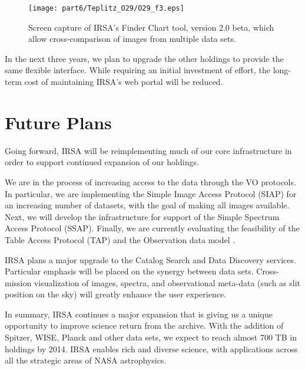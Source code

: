 \begin{figure}[t]

\centering
\texttt{[image: part6/Teplitz\_O29/O29\_f3.eps]}
\caption{Screen capture of IRSA's Finder Chart tool, version 2.0 beta, which allow cross-comparison of images from multiple data sets.}

\end{figure}


In the next three years, we plan to upgrade the other holdings to provide the same flexible interface. While requiring an initial investment of effort, the long-term cost of maintaining IRSA’s web portal will be reduced.

\section{Future Plans}

Going forward, IRSA will be reimplementing much of our core infrastructure in order to support continued expansion of our holdings.  

We are in the process of increasing access to the data through the VO protocols.  In particular, we are implementing the Simple Image Access Protocol (SIAP) for an increasing number of datasets, with the goal of making all images available.  Next, we will develop the infrastructure for support of the Simple Spectrum Access Protocol (SSAP). Finally, we are currently evaluating the feasibility of the Table Access Protocol (TAP) and the Observation data model \citet{louys11}.

IRSA plans a major upgrade to the Catalog Search and Data Discovery services.  Particular emphasis will be placed on the synergy between data sets. Cross-mission visualization of images, spectra, and observational meta-data (such as slit position on the sky) will greatly enhance the user experience.

In summary, IRSA continues a major expansion that is giving us a unique opportunity to improve science return from the archive.  With the addition of Spitzer, WISE, Planck and other data sets, we expect to reach almost 700 TB in holdings by 2014.  IRSA enables rich and diverse science, with applications across all the strategic areas of NASA astrophysics.  


